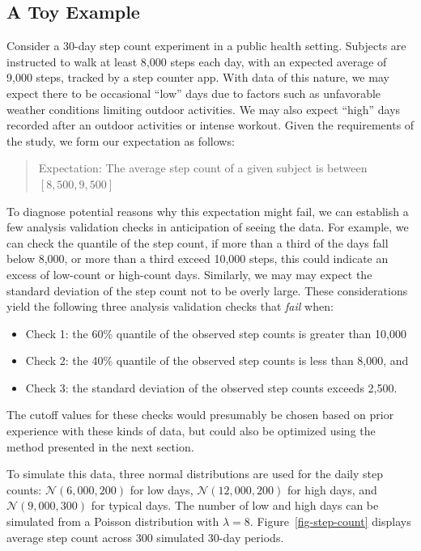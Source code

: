\documentclass[
  12pt,
]{interact}
\providecommand{\tightlist}{%
  \setlength{\itemsep}{0pt}\setlength{\parskip}{0pt}}
\begin{document}
\subsection{A Toy Example}\label{sec-toy}

Consider a 30-day step count experiment in a public health setting.
Subjects are instructed to walk at least 8,000 steps each day, with an
expected average of 9,000 steps, tracked by a step counter app. With
data of this nature, we may expect there to be occasional ``low'' days
due to factors such as unfavorable weather conditions limiting outdoor
activities. We may also expect ``high'' days recorded after an outdoor
activities or intense workout. Given the requirements of the study, we
form our expectation as follows:

\begin{quote}
Expectation: The average step count of a given subject is between
\([8,500, 9,500]\)
\end{quote}

To diagnose potential reasons why this expectation might fail, we can
establish a few analysis validation checks in anticipation of seeing the
data. For example, we can check the quantile of the step count, if more
than a third of the days fall below 8,000, or more than a third exceed
10,000 steps, this could indicate an excess of low-count or high-count
days. Similarly, we may may expect the standard deviation of the step
count not to be overly large. These considerations yield the following
three analysis validation checks that \emph{fail} when:

\begin{itemize}
\tightlist
\item
  Check 1: the 60\% quantile of the observed step counts is greater than
  10,000
\item
  Check 2: the 40\% quantile of the observed step counts is less than
  8,000, and
\item
  Check 3: the standard deviation of the observed step counts exceeds
  2,500.
\end{itemize}

The cutoff values for these checks would presumably be chosen based on
prior experience with these kinds of data, but could also be optimized
using the method presented in the next section.

To simulate this data, three normal distributions are used for the daily
step counts: \(\mathcal{N}(6,000, 200)\) for low days,
\(\mathcal{N}(12,000, 200)\) for high days, and
\(\mathcal{N}(9,000, 300)\) for typical days. The number of low and high
days can be simulated from a Poisson distribution with \(\lambda = 8\).
Figure~\ref{fig-step-count} displays average step count across 300
simulated 30-day periods.
\end{document}
